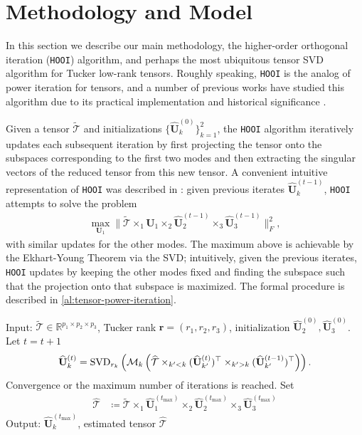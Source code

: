 \documentclass[10pt]{article}
\newcommand{\0}{{\mathbf{0}}}
\newcommand{\1}{{\mathbf{1}}}
\newcommand{\U}{{\mathbf{U}}}
\newcommand{\SVD}{{\rm SVD}}
\newcommand{\br}{\boldsymbol{r}}
\renewcommand{\citet}{\cite}
\newcommand{\uhat}{\mathbf{\hat{U}}}
\renewcommand{\tilde}{\widetilde}
\renewcommand{\hat}{\widehat}
\renewcommand{\hat}{\widehat}
\begin{document}
\section{Methodology and Model}
\label{sec:assumptions}
In this section we describe our main methodology, the higher-order orthogonal iteration (\texttt{HOOI})  algorithm, and perhaps the most ubiquitous tensor SVD algorithm for Tucker low-rank tensors.  Roughly speaking, \texttt{HOOI} is the analog of power iteration for tensors, and a number of previous works have studied this algorithm due to its practical implementation and historical significance \citep{de_lathauwer_best_2000,zhang_tensor_2018,luo_sharp_2021,agterberg_estimating_2022}.  


Given  a tensor $\mathcal{\tilde{T}}$ and initializations $\{\uhat_k^{(0)}\}_{k=1}^{2}$, the \texttt{HOOI} algorithm iteratively updates each subsequent iteration by first projecting the tensor onto the subspaces corresponding to the first two modes and then extracting the singular vectors of the reduced tensor from this new tensor. A convenient intuitive representation of \texttt{HOOI} was described in \citet{xia_inference_2022}: given previous iterates $\uhat_k^{(t-1)}$, \texttt{HOOI} attempts to solve the problem 
\begin{align*}
    \max_{\U_1} \| \mathcal{\tilde T} \times_1 \U_1 \times_2 \uhat_2^{(t-1)} \times_3 \uhat_3^{(t-1)} \|_F^2,
\end{align*}
with similar updates for the other modes.  The maximum above is achievable by the Ekhart-Young Theorem via the SVD; intuitively, given the previous   iterates, \texttt{HOOI} updates by keeping the other modes fixed and finding the subspace such that the projection onto that subspace is  maximized.  The formal procedure is described in \cref{al:tensor-power-iteration}.


\begin{algorithm}[t]
	\caption{Higher-Order Orthogonal Iteration (\texttt{HOOI})}
	\begin{algorithmic}[1]
		\State Input: $\mathcal{\tilde{T}}\in \mathbb{R}^{p_1 \times p_2 \times p_3}$, Tucker rank $\br = (r_1, r_2,r_3)$, initialization $\uhat_2^{(0)}, \uhat_3^{(0)}$.  
		\Repeat
		\State Let $t = t+1$
		\begin{equation*}
		\uhat_k^{(t)} = 
		\SVD_{r_k}\left(\mathcal{M}_k\left(\mathcal{\widehat{T}}\times_{k' < k} (\uhat_{k'}^{(t)})^\top \times_{k'>k} (\uhat_{k'}^{(t-1)})^\top\right)\right).
		\end{equation*}
		\EndFor
		\Until Convergence or the maximum number of iterations is reached.
		\State Set 
		\begin{align*}
		    \mathcal{\hat T} &\coloneqq \mathcal{\tilde T}  \times_1 \uhat_1^{(t_{\max})} \times_2 \uhat_2^{(t_{\max})} \times_3 \uhat_3^{(t_{\max})}
		\end{align*}
		\State Output: $\uhat_k^{(t_{\max})}$, estimated  tensor $\mathcal{\hat T}$
	\end{algorithmic}\label{al:tensor-power-iteration}
\end{algorithm}
\end{document}
